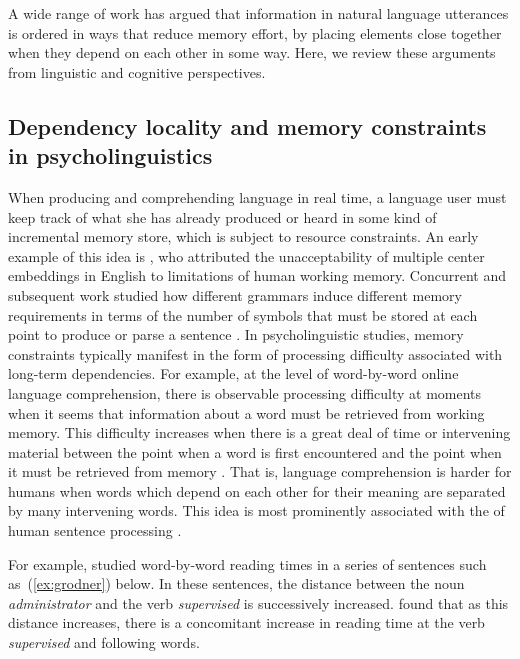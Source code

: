 A wide range of work has argued that information in natural language utterances is ordered in ways that reduce memory effort, by placing elements close together when they depend on each other in some way. Here, we review these arguments from linguistic and cognitive perspectives.

\subsection{Dependency locality and memory constraints in psycholinguistics}

When producing and comprehending language in real time, a language user must keep track of what she has already produced or heard in some kind of incremental memory store, which is subject to resource constraints.
An early example of this idea is \citet{miller-finitary-1963}, who attributed the unacceptability of multiple center embeddings in English to limitations of human working memory.
Concurrent and subsequent work studied how different grammars induce different memory requirements in terms of the number of symbols that must be stored at each point to produce or parse a sentence \citep{yngve1960model,abney1991memory,gibson1991computational,resnik1992left}. 
In psycholinguistic studies, memory constraints typically manifest in the form of processing difficulty associated with long-term dependencies.
For example, at the level of word-by-word online language comprehension, there is observable processing difficulty at moments when it seems that information about a word must be retrieved from working memory. 
This difficulty increases when there is a great deal of time or intervening material between the point when a word is first encountered and the point when it must be retrieved from memory  \citep{gibson1998linguistic,gibson1999memory,gibson2000dependency,mcelree2000sentence,lewis-activation-based-2005,bartek-search-2011,nicenboim2015working,balling2017effects}. 
That is, language comprehension is harder for humans when words which depend on each other for their meaning are separated by many intervening words.
This idea is most prominently associated with the  of human sentence processing \citep{gibson2000dependency}.

For example, \citet{grodner-consequences-2005} studied word-by-word reading times in a series of sentences such as~(\ref{ex:grodner}) below. 
In these sentences, the distance between the noun \emph{administrator} and the verb \emph{supervised} is successively increased. \citet{grodner-consequences-2005} found that as this distance increases, there is a concomitant increase in reading time at the verb \emph{supervised} and following words. 

